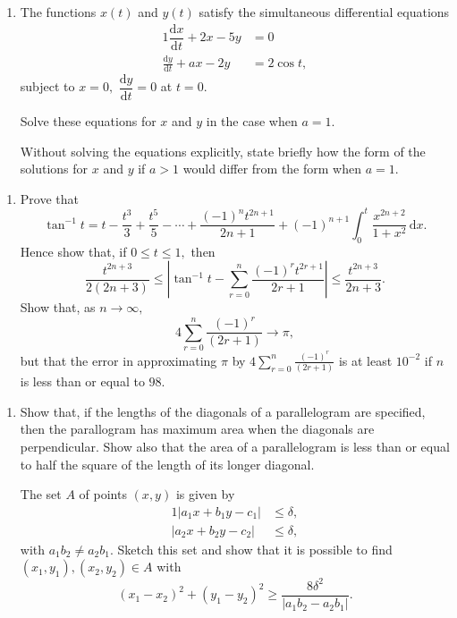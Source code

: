 \documentclass[a4, 11pt]{report}
\newlength{\qspace}
\newcounter{qnumber}
\newenvironment{question}%
 {\vspace{\qspace}
  \begin{enumerate}[\bfseries 1\quad][10]%
    \setcounter{enumi}{\value{qnumber}}%
    \item%
 }
{
  \end{enumerate}
  \filbreak
  \stepcounter{qnumber}
 }
\begin{document}
	\begin{question}
The functions $x(t)$ and $y(t)$ satisfy the simultaneous differential
equations 
\begin{alignat*}{1}
\dfrac{\mathrm{d}x}{\mathrm{d}t}+2x-5y & =0\\
\frac{\mathrm{d}y}{\mathrm{d}t}+ax-2y & =2\cos t,
\end{alignat*}
subject to $x=0,$ $\dfrac{\mathrm{d}y}{\mathrm{d}t}=0$ at $t=0.$ 


Solve these equations for $x$ and $y$ in the case when $a=1$. 

Without
solving the equations explicitly, state briefly how the form of the
solutions for $x$ and $y$ if $a>1$ would differ from the form when
$a=1.$ 
	 \end{question}
	 
\begin{question}
Prove that 
\[
\tan^{-1}t=t-\frac{t^{3}}{3}+\frac{t^{5}}{5}-\cdots+\frac{(-1)^{n}t^{2n+1}}{2n+1}+(-1)^{n+1}\int_{0}^{t}\frac{x^{2n+2}}{1+x^{2}}\,\mathrm{d}x.
\]
Hence show that, if $0\leqslant t\leqslant1,$ then 
\[
\frac{t^{2n+3}}{2(2n+3)}\leqslant\left|\tan^{-1}t-\sum_{r=0}^{n}\frac{(-1)^{r}t^{2r+1}}{2r+1}\right|\leqslant\frac{t^{2n+3}}{2n+3}.
\]
Show that, as $n\rightarrow\infty,$ 
\[
4\sum_{r=0}^{n}\frac{(-1)^{r}}{(2r+1)}\rightarrow\pi,
\]
but that the error in approximating $\pi$ by ${\displaystyle 4\sum_{r=0}^{n}\frac{(-1)^{r}}{(2r+1)}}$
is at least $10^{-2}$ if $n$ is less than or equal to $98$. 
	\end{question}
	
	\begin{question}
Show that, if the lengths of the diagonals of a parallelogram are
specified, then the parallogram has maximum area when the diagonals
are perpendicular. Show also that the area of a parallelogram is less
than or equal to half the square of the length of its longer diagonal. 


The set $A$ of points $(x,y)$ is given by 
\begin{alignat*}{1}
\left|a_{1}x+b_{1}y-c_{1}\right| & \leqslant\delta,\\
\left|a_{2}x+b_{2}y-c_{2}\right| & \leqslant\delta,
\end{alignat*}
 with $a_{1}b_{2}\neq a_{2}b_{1}.$ Sketch this set and show that
it is possible to find $(x_{1},y_{1}),(x_{2},y_{2})\in A$ with 
\[
(x_{1}-x_{2})^{2}+(y_{1}-y_{2})^{2}\geqslant\frac{8\delta^{2}}{\left|a_{1}b_{2}-a_{2}b_{1}\right|}.
\]
		
		\end{question}
		
\end{document}
